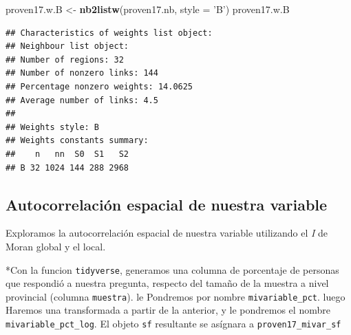 \documentclass[11pt,]{article}
\newenvironment{Shaded}{\begin{snugshade}}{\end{snugshade}}
\newcommand{\KeywordTok}[1]{\textcolor[rgb]{0.13,0.29,0.53}{\textbf{#1}}}
\newcommand{\DataTypeTok}[1]{\textcolor[rgb]{0.13,0.29,0.53}{#1}}
\newcommand{\StringTok}[1]{\textcolor[rgb]{0.31,0.60,0.02}{#1}}
\newcommand{\NormalTok}[1]{#1}
\begin{document}
\begin{Shaded}
\begin{Highlighting}[]
\NormalTok{proven17.w.B <-}\StringTok{ }\KeywordTok{nb2listw}\NormalTok{(proven17.nb, }\DataTypeTok{style =} \StringTok{'B'}\NormalTok{)}
\NormalTok{proven17.w.B}
\end{Highlighting}
\end{Shaded}

\begin{verbatim}
## Characteristics of weights list object:
## Neighbour list object:
## Number of regions: 32 
## Number of nonzero links: 144 
## Percentage nonzero weights: 14.0625 
## Average number of links: 4.5 
## 
## Weights style: B 
## Weights constants summary:
##    n   nn  S0  S1   S2
## B 32 1024 144 288 2968
\end{verbatim}

\subsection{Autocorrelación espacial de nuestra
variable}\label{autocorrelaciuxf3n-espacial-de-nuestra-variable}

Exploramos la autocorrelación espacial de nuestra variable utilizando el
\emph{I} de Moran global y el local.

*Con la funcion \texttt{tidyverse}, generamos una columna de porcentaje
de personas que respondió a nuestra pregunta, respecto del tamaño de la
muestra a nivel provincial (columna \texttt{muestra}). le Pondremos por
nombre \texttt{mivariable\_pct}. luego Haremos una transformada a partir
de la anterior, y le pondremos el nombre \texttt{mivariable\_pct\_log}.
El objeto \texttt{sf} resultante se asígnara a
\texttt{proven17\_mivar\_sf}
\end{document}
